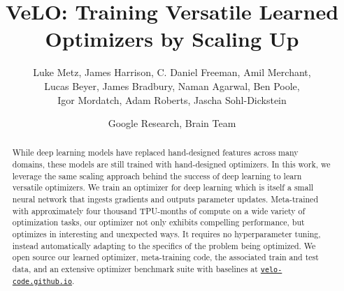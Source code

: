 \documentclass[11pt]{article}
\title{\textbf{VeLO}: Training Versatile Learned Optimizers by Scaling Up}
\author{%
  Luke Metz\footnotemark[1],
  James Harrison\footnotemark[2],
  C. Daniel Freeman,
  Amil Merchant, \\
  Lucas Beyer,
  James Bradbury,
  Naman Agarwal,
  Ben Poole,\\
  Igor Mordatch,
  Adam Roberts,
  Jascha Sohl-Dickstein\footnotemark[3]
}
\date{Google Research, Brain Team}
\begin{document}
\maketitle


\begin{abstract}
While deep learning models have replaced hand-designed features across many domains, these models are still trained with hand-designed optimizers. In this work, we leverage the same scaling approach behind the success of deep learning to learn versatile optimizers.
We train an optimizer for deep learning which is itself a small neural network that ingests gradients and outputs parameter updates. 
Meta-trained with approximately four thousand TPU-months of compute on a wide variety of optimization tasks,
our optimizer not only exhibits compelling performance, but optimizes in interesting and unexpected ways.
It requires no hyperparameter tuning, instead automatically adapting to the specifics of the problem being optimized.
We open source our learned optimizer, meta-training code, the associated train and test data, and an extensive optimizer benchmark suite with baselines at \href{https://velo-code.github.io}{\texttt{velo-code.github.io}}.
\vspace{2em}
\end{abstract}
\end{document}
